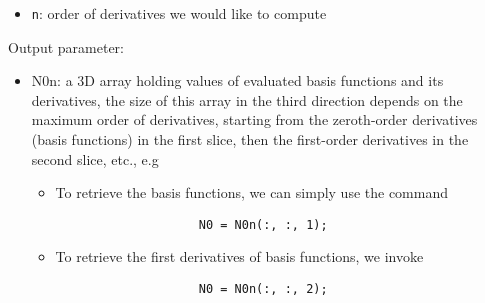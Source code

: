 \begin{itemize}
\begin{itemize}
        \item \lstinline{n}: order of derivatives we would like to compute
    \end{itemize}
    Output parameter:
    \begin{itemize}
        \item N0n: a 3D array holding values of evaluated basis functions and its derivatives, the size of this array in the third direction depends on the maximum order of derivatives, starting from the zeroth-order derivatives (basis functions) in the first slice, then the first-order derivatives in the second slice, etc., e.g
            \begin{itemize}
                \item To retrieve the basis functions, we can simply use the command
                \begin{lstlisting}
                    N0 = N0n(:, :, 1);
                \end{lstlisting}
                \item To retrieve the first derivatives of basis functions, we invoke
                 \begin{lstlisting}
                    N0 = N0n(:, :, 2);
                \end{lstlisting}
            \end{itemize}
    \end{itemize}
\end{itemize}
